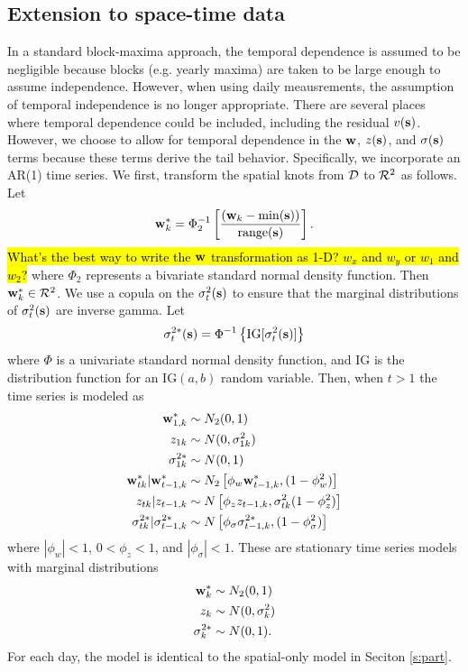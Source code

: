 \documentclass[11pt]{article}
\begin{document}
\subsection{Extension to space-time data} \label{s:temporal}
In a standard block-maxima approach, the temporal dependence is assumed to be negligible because blocks (e.g. yearly maxima) are taken to be large enough to assume independence.
However, when using daily meausrements, the assumption of temporal independence is no longer appropriate.
There are several places where temporal dependence could be included, including the residual $v(\mbox{\bf s})$.
However, we choose to allow for temporal dependence in the $\mbox{\bf w}$, $z(\mbox{\bf s})$, and $\sigma(\mbox{\bf s})$ terms because these terms derive the tail behavior.
Specifically, we incorporate an AR(1) time series.
We first, transform the spatial knots from ${\cal D}$ to ${\cal R}^2$ as follows.
Let
\begin{align*}
  \mbox{\bf w}^*_k = \Phi^{-1}_2\left[ \frac{ (\mbox{\bf w}_k - \min(\mbox{\bf s}))}{ \text{range}(\mbox{\bf s}) } \right].
\end{align*}
\hl{What's the best way to write the $\mbox{\bf w}$ transformation as 1-D? $w_x$ and $w_y$ or $w_1$ and $w_2$?}
where $\Phi_2$ represents a bivariate standard normal density function.
Then $\mbox{\bf w}^*_k \in {\cal R}^2$.
We use a copula on the $\sigma^2_t(\mbox{\bf s})$ to ensure that the marginal distributions of $\sigma^2_t(\mbox{\bf s})$ are inverse gamma.
Let
\begin{align*}
  \sigma^{2*}_t(\mbox{\bf s}) =\Phi^{-1}\left\{ \text{IG}[\sigma^2_t(\mbox{\bf s})] \right\}
\end{align*}
where $\Phi$ is a univariate standard normal density function, and IG is the distribution function for an IG$(a, b)$ random variable.
Then, when $t > 1$ the time series is modeled as
\begin{align*}
  \mbox{\bf w}^*_{1, k} & \sim N_2(0, 1)\\
  z_{1k} & \sim N(0, \sigma^2_{1k})\\
  \sigma^{2*}_{1k} &\sim N(0, 1)\\
  \mbox{\bf w}^*_{tk} | \mbox{\bf w}^*_{t-1, k} &\sim N_2\left[\phi_w \mbox{\bf w}^*_{t-1, k}, (1 - \phi_w^2) \right] \\
  z_{tk} | z_{t-1, k} &\sim N \left[\phi_z z_{t-1, k}, \sigma^2_{tk} (1 - \phi_z^2)\right] \\
  \sigma^{2*}_{tk} | \sigma^{2*}_{t-1, k} &\sim N \left[\phi_\sigma \sigma^{2*}_{t-1, k}, (1 - \phi_\sigma^2) \right]
\end{align*}
where $|\phi_w| < 1$, $0 < \phi_z < 1$, and $|\phi_\sigma| < 1$.
These are stationary time series models with marginal distributions
\begin{align*}
  \mbox{\bf w}^*_{k} & \sim N_2(0, 1)\\
  z_{k} & \sim N(0, \sigma^2_{k})\\
  \sigma^{2*}_{k} &\sim N(0, 1).
\end{align*}
For each day, the model is identical to the spatial-only model in Seciton \ref{s:part}.
\end{document}
